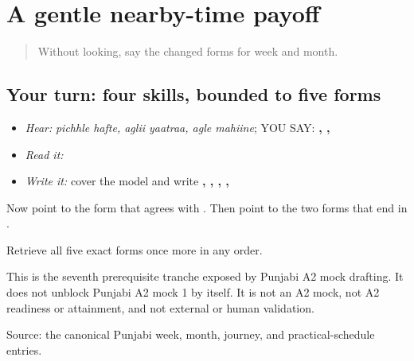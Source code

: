 \section[\texorpdfstring{\pa{ਪਿਛਲੇ} \pa{ਹਫ਼ਤੇ} · \pa{ਅਗਲੀ} … (pichhle hafte …)}{ਪਿਛਲੇ ਹਫ਼ਤੇ · ਅਗਲੀ … (pichhle hafte …)}]{A gentle nearby-time payoff}

\label{lesson:PA-C184-payoff}



\begin{quote}
Without looking, say the changed forms for week and month.
\end{quote}

\subsection*{Your turn: four skills, bounded to five forms}
\begin{itemize}
\raggedright
  \item \emph{Hear:} \emph{pichhle hafte, aglii yaatraa, agle mahiine}; YOU SAY: \textbf{ ,  ,  }
  \item \emph{Read it:} \textbf{   }
  \item \emph{Write it:} cover the model and write \textbf{, , , , }
\end{itemize}

Now point to the form that agrees with \textbf{}. Then point to the two forms that end in \textbf{}.

\begin{tcolorbox}[breakable,colback=teal!4,colframe=teal!35!black,title={Before you move on}]
Retrieve all five exact forms once more in any order.

This is the seventh prerequisite tranche exposed by Punjabi A2 mock drafting. It does not unblock Punjabi A2 mock 1 by itself. It is not an A2 mock, not A2 readiness or attainment, and not external or human validation.

Source: the canonical Punjabi week, month, journey, and practical-schedule entries.
\end{tcolorbox}
